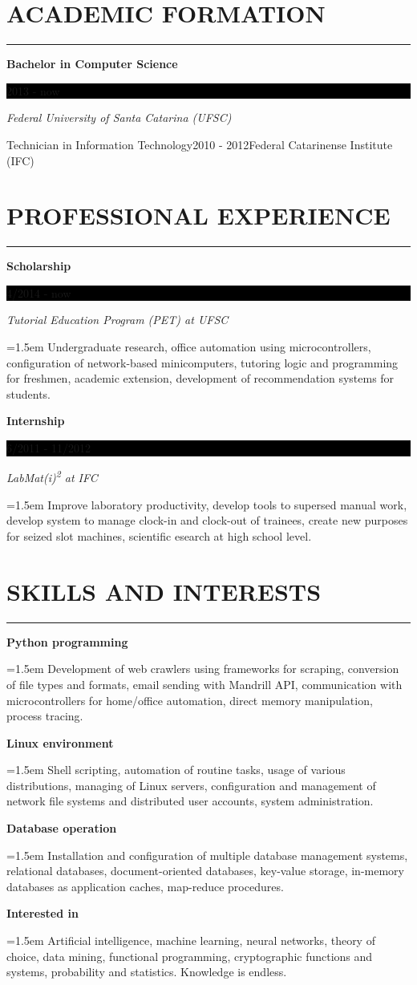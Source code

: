 \documentclass{article}
\newcommand{\formationentry}[4]{%
	\noindent \textbf{#1} \hfill
	\colorbox{black}{%
		\parbox[c][1em]{8em}{%
			\hfill \color{white} #2
		}
	} \par
	\noindent \textit{#3} \par
	\normalsize
	\vspace{0.75em}
}
\newcommand{\experienceentry}[4]{%
	\noindent \textbf{#1} \hfill
	\colorbox{black}{%
		\parbox[c][1em]{8em}{%
			\hfill \color{white} #2
		}
	} \par
	\noindent \textit{#3} \par
	\noindent \hangindent=1.5em \hangafter=0 \small #4 \par
	\normalsize
	\vspace{0.75em}
}
\newcommand{\skillentry}[2]{%
	\noindent \textbf{#1} \hfill \par
	\noindent \hangindent=1.5em \hangafter=0 \small #2 \par
	\normalsize
	\vspace{0.75em}
}
\newenvironment{main}{%
\noindent
\begin{minipage}[t]{\dimexpr0.75\textwidth-1.5em}%
\let\oldsection\section
\renewcommand{\section}[1]{\oldsection*{\uppercase{##1}}\vspace{-0.5em}\hrule\vspace{1em}}
}{%
\let\section\oldsection
\end{minipage}%
}
\begin{document}
\begin{main}%
\section{Academic Formation}
\formationentry{Bachelor in Computer Science}{2013 - now}{Federal University
of Santa Catarina (UFSC)}

\formationentry{Technician in Information Technology}{2010 - 2012}{Federal
Catarinense Institute (IFC)}


\section{Professional Experience}
\experienceentry{Scholarship}{4/2014 - now}{Tutorial Education Program (PET) at
UFSC}{Undergraduate research, office automation using microcontrollers, configuration of network-based minicomputers, tutoring logic and programming for freshmen, academic extension, development of recommendation systems for students.}

\experienceentry{Internship}{6/2011 - 11/2012}{LabMat(i)\textsuperscript{2} at
IFC}{Improve laboratory productivity, develop tools to supersed manual work, develop system to manage clock-in and clock-out of trainees, create new purposes for seized slot machines, scientific esearch at high school level.}


\section{Skills and Interests}
\skillentry{Python programming}{Development of web crawlers using frameworks
for scraping, conversion of file types and formats, email sending with
Mandrill API, communication with microcontrollers for home/office automation,
direct memory manipulation, process tracing.}

\skillentry{Linux environment}{Shell scripting, automation of routine tasks, usage of various distributions, managing of Linux servers, configuration and management of network file systems and distributed user accounts, system administration.}

\skillentry{Database operation}{Installation and configuration of multiple database management systems, relational databases, document-oriented databases, key-value storage, in-memory databases as application caches, map-reduce procedures.}

\skillentry{Interested in}{Artificial intelligence, machine learning, neural networks, theory of choice, data mining, functional programming, cryptographic functions and systems, probability and statistics. Knowledge is endless.}



\end{main}
\end{document}
